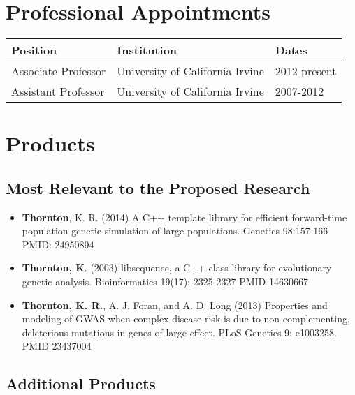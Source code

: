 \documentclass[10pt]{article}
\begin{document}
\section{Professional Appointments}

\begin{tabular}{l l l}
Position & Institution                 & Dates\\
\hline
Associate Professor & University of California Irvine &		2012-present \\
Assistant Professor & University of California Irvine &		2007-2012 \\

\end{tabular}

\section{Products}

\subsection*{Most Relevant to the Proposed Research}

\begin{itemize} \setlength{\itemsep}{0pt} \setlength{\parskip}{2pt} \setlength{\parsep}{0pt}

\item \textbf{Thornton}, K. R. (2014) A C++ template library for efficient forward-time population genetic simulation of large populations. Genetics 98:157-166 PMID: 24950894

\item \textbf{Thornton, K}. (2003) libsequence, a C++ class library for evolutionary genetic analysis. Bioinformatics 19(17): 2325-2327 PMID 14630667

\item \textbf{Thornton, K. R.}, A. J. Foran, and A. D. Long (2013) Properties and modeling of GWAS when complex disease risk is due to non-complementing, deleterious mutations in genes of large effect. PLoS Genetics 9: e1003258. PMID 23437004

\end{itemize}

\subsection*{Additional Products}
\end{document}
